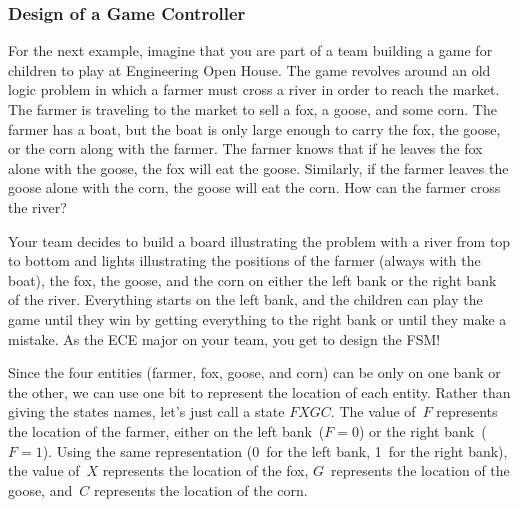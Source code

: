 \subsubsection{Design of a Game Controller}

For the next example, imagine that you are part of a team building a
game for children to play at Engineering Open House.
%
The game revolves around an old logic problem in which a farmer must
cross a river in order to reach the market.  The farmer is traveling
to the market to sell a fox, a goose, and some corn.  The farmer has
a boat, but the boat is only large enough to carry the fox, the goose,
or the corn along with the farmer.  The farmer knows that if he leaves
the fox alone with the goose, the fox will eat the goose.  Similarly,
if the farmer leaves the goose alone with the corn, the goose will 
eat the corn.
%
How can the farmer cross the river?

Your team decides to build a board illustrating the problem with
a river from top to bottom and lights illustrating the positions of 
the farmer (always with the boat), the fox, the goose, and the
corn on either the left bank or the right bank of the river.
Everything starts on the left bank, and the children can play 
the game until they win by getting everything to the right bank or
until they make a mistake.
%
As the ECE major on your team, you get to design the FSM!


Since the four entities (farmer, fox, goose, and corn) can be only
on one bank or the other, we can use one bit to represent the location
of each entity.  Rather than giving the states names, let's just
call a state $FXGC$.  The value of~$F$ represents the location of the farmer,
either on the left bank~($F=0$) or the right bank~($F=1$).  Using
the same representation (0~for the left bank, 1~for the right bank),
the value of~$X$ represents the location of the fox, $G$~represents the
location of the goose, and~$C$ represents the location of the corn.

